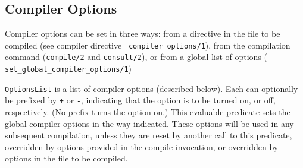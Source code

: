 \subsection{Compiler Options}\label{sec:CompilerOptions}

Compiler options can be set in three ways: from a directive in the
file to be compiled (see compiler directive {\tt
  compiler\_options/1}), from the compilation command ({\tt compile/2}
and {\tt consult/2}), or from a global list of options ({\tt
  set\_global\_compiler\_options/1})

\begin{description}
    {\tt OptionsList} is a list of compiler options (described below).
    Each can optionally be prefixed by \verb|+| or \verb|-|,
    indicating that the option is to be turned on, or off,
    respectively.  (No prefix turns the option on.)  This evaluable
    predicate sets the global compiler options in the way indicated.
    These options will be used in any subsequent compilation, unless
    they are 
    reset by another call to this predicate, overridden by options
    provided in the compile invocation, or overridden by options in
    the file to be compiled.
\end{description}

